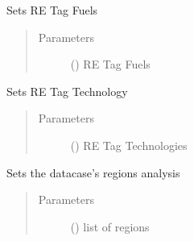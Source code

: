 \documentclass[a4paper,12pt,english]{article}
\begin{document}
\begin{fulllineitems}
\begin{fulllineitems}
\label{\detokenize{GOCPI:GOCPI.CreateCases.CreateCases.set_re_tag_fuel}}
Sets RE Tag Fuels
\begin{quote}\begin{description}
\item[{Parameters}] \leavevmode
{} (\sphinxstyleliteralemphasis{\sphinxupquote{, }}) \textendash{} RE Tag Fuels

\end{description}\end{quote}

\end{fulllineitems}


\begin{fulllineitems}
\label{\detokenize{GOCPI:GOCPI.CreateCases.CreateCases.set_re_tag_technology}}
Sets RE Tag Technology
\begin{quote}\begin{description}
\item[{Parameters}] \leavevmode
{} (\sphinxstyleliteralemphasis{\sphinxupquote{, }}) \textendash{} RE Tag Technologies

\end{description}\end{quote}

\end{fulllineitems}


\begin{fulllineitems}
\label{\detokenize{GOCPI:GOCPI.CreateCases.CreateCases.set_region}}
Sets the datacase’s regions analysis
\begin{quote}\begin{description}
\item[{Parameters}] \leavevmode
{} () \textendash{} list of regions


\end{description}
\end{quote}
\end{fulllineitems}
\end{fulllineitems}
\end{document}
